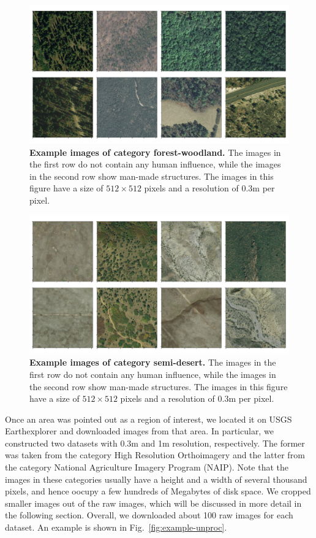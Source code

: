 \begin{figure}[h!]
	\centering
	\captionsetup{width=1\linewidth}
	\includegraphics[width=1\textwidth]{Figures/forest-woodland_sample.pdf}
	\caption{\textbf{Example images of category forest-woodland.} The images in the first row do not contain any human influence, while the images in the second row show man-made structures. The images in this figure have a size of $512\times512$ pixels and a resolution of $0.3$m per pixel.}
	\label{fig:forest-sample}
\end{figure}

\begin{figure}[h!]
	\centering
	\captionsetup{width=1\linewidth}
	\includegraphics[width=1\textwidth]{Figures/semi-desert_sample.pdf}
	\caption{\textbf{Example images of category semi-desert.} The images in the first row do not contain any human influence, while the images in the second row show man-made structures. The images in this figure have a size of $512\times512$ pixels and a resolution of $0.3$m per pixel.}
	\label{fig:desert-sample}
\end{figure}

Once an area was pointed out as a region of interest, we located it on USGS Earthexplorer and downloaded images from that area. In particular, we constructed two datasets with 0.3m and 1m resolution, respectively. The former was taken from the category High Resolution Orthoimagery and the latter from the category National Agriculture Imagery Program (NAIP). Note that the images in these categories usually have a height and a width of several thousand pixels, and hence oocupy a few hundreds of Megabytes of disk space. We cropped smaller images out of the raw images, which will be discussed in more detail in the following section. Overall, we downloaded about 100 raw images for each dataset. An example is shown in Fig.~\ref{fig:example-unproc}.


